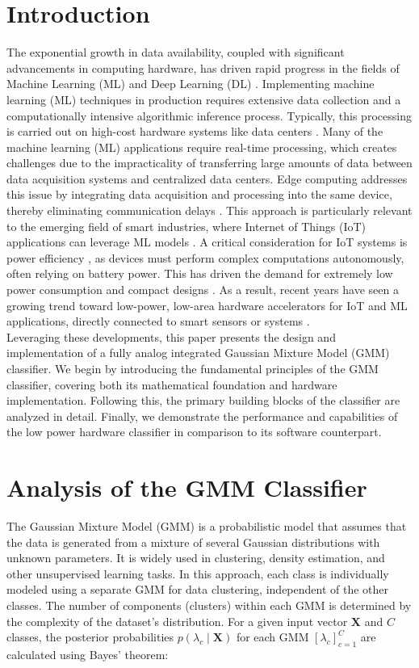 \documentclass[conference]{IEEEtran}
\begin{document}
\section{\textbf{Introduction}}
The exponential growth in data availability, coupled with significant advancements in computing hardware, has driven rapid progress in the fields of Machine Learning (ML) and Deep Learning (DL) \cite{panic2020gaussian}. 
Implementing machine learning (ML) techniques in production requires extensive data collection and a computationally intensive algorithmic inference process. Typically, this processing is carried out on high-cost hardware systems like data centers \cite{ALIMISIS2022105510}. Many of the machine learning (ML) applications require real-time processing, which creates challenges due to the impracticality of transferring large amounts of data between data acquisition systems and centralized data centers. Edge computing addresses this issue by integrating data acquisition and processing into the same device, thereby eliminating communication delays \cite{ALIMISIS2022105510}. This approach is particularly relevant to the emerging field of smart industries, where Internet of Things (IoT) applications can leverage ML models . A critical consideration for IoT systems is power efficiency , as devices must perform complex computations autonomously, often relying on battery power. This has driven the demand for extremely low power consumption and compact designs \cite{ALIMISIS2022105510}. As a result, recent years have seen a growing trend toward low-power, low-area hardware accelerators for IoT and ML applications, directly connected to smart sensors or systems .\\



Leveraging these developments, this paper presents the design and implementation of a fully analog integrated Gaussian Mixture Model (GMM) classifier. We begin by introducing the fundamental principles of the GMM classifier, covering both its mathematical foundation and hardware implementation. Following this, the primary building blocks of the classifier are analyzed in detail. Finally, we demonstrate the performance and capabilities of the low power hardware classifier in comparison to its software counterpart.

\section{\textbf{Analysis of the GMM Classifier}}
The Gaussian Mixture Model (GMM) is a probabilistic model that assumes that the data is generated from a mixture of several Gaussian distributions with unknown parameters. It is widely used in clustering, density estimation, and other unsupervised learning tasks.
In this approach, each class is individually modeled using a separate GMM for data clustering, independent of the other classes. The number of components (clusters) within each GMM is determined by the complexity of the dataset's distribution. For a given input vector \( \mathbf{X} \) and \( C \) classes, the posterior probabilities \( p(\lambda_c \mid \mathbf{X}) \) for each GMM \( [\lambda_c]_{c=1}^{C} \) are calculated using Bayes' theorem:
\end{document}
